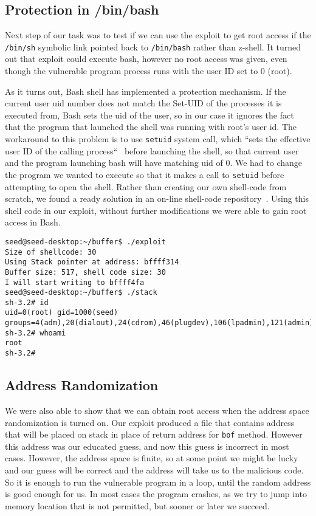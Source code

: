 \documentclass[12pt, a4paper, pdflatex]{article}
\begin{document}
\subsection{Protection in /bin/bash}

Next step of our task was to test if we can use the exploit to get root access if the \texttt{/bin/sh} symbolic link pointed back to \texttt{/bin/bash} rather than z-shell. It turned out that exploit could execute bash, however no root access was given, even though the vulnerable program  process runs with the user ID set to 0 (root). 

As it turns out, Bash shell has implemented a protection mechanism. If the current user uid number does not match the Set-UID of the processes it is executed from, Bash sets the uid of the user, so in our case it ignores the fact that the program that launched the shell was running with root's user id. The workaround to this problem is to use \texttt{setuid} system call, which ``sets the effective user ID of the calling process``~\cite{setuidman} before launching the shell, so that current user and the program launching bash will have matching uid of 0. We had to change the program we wanted to execute so that it makes a call to \texttt{setuid} before attempting to open the shell. Rather than creating our own shell-code from scratch, we found a ready solution in an on-line shell-code repository~\cite{shellstorm}. Using this shell code in our exploit, without further modifications we were able to gain root access in Bash.

\vspace{1em}
\lstset{
	captionpos=b,
	frame=single,
	language=BASH,
	breaklines=true,
	caption=Function with buffer overflow vulnerability,
	label=bof:root2,
  float=tb
}
\begin{lstlisting}
seed@seed-desktop:~/buffer$ ./exploit 
Size of shellcode: 30
Using Stack pointer at address: bffff314
Buffer size: 517, shell code size: 30
I will start writing to bffff4fa
seed@seed-desktop:~/buffer$ ./stack 
sh-3.2# id
uid=0(root) gid=1000(seed) groups=4(adm),20(dialout),24(cdrom),46(plugdev),106(lpadmin),121(admin),122(sambashare),1000(seed)
sh-3.2# whoami
root
sh-3.2# 
\end{lstlisting}

\subsection{Address Randomization}

We were also able to show that we can obtain root access when the address space randomization is turned on. Our exploit produced a file that contains address that will be placed on stack in place of return address for \texttt{bof} method. However this address was our educated guess, and now this guess is incorrect in most cases. However, the address space is finite, so at some point we might be lucky and our guess will be correct and the address will take us to the malicious code. So it is enough to run the vulnerable program in a loop, until the random address is good enough for us. In most cases the program crashes, as we try to jump into memory location that is not permitted, but sooner or later we succeed.
\end{document}
